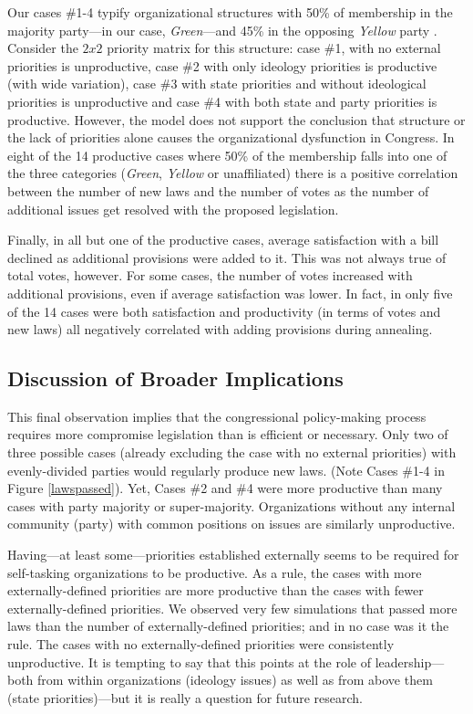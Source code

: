 \documentclass[pdftex,12pt]{llncs}
\begin{document}
Our cases \#1-4 typify organizational structures with 50\% of membership in the majority party---in our case, \textit{Green}---and 45\% in the opposing \textit{Yellow} party .
Consider the $2 x 2$ priority matrix for this structure: case \#1, with no external priorities is unproductive, case \#2 with only ideology priorities is productive (with wide variation), case \#3 with state priorities and without ideological priorities is unproductive and case \#4 with both state and party priorities is productive. 
However, the model does not support the conclusion that structure or the lack of priorities alone causes the organizational dysfunction in Congress.
In eight of the 14 productive cases where 50\% of the membership falls into one of the three categories (\textit{Green}, \textit{Yellow} or unaffiliated) there is a positive correlation between the number of new laws and the number of votes as the number of additional issues get resolved with the proposed legislation.   

Finally, in all but one of the productive cases, average satisfaction with a bill declined as additional provisions were added to it. 
This was not always true of total votes, however.
For some cases, the number of votes increased with additional provisions, even if average satisfaction was lower. 
In fact, in only five of the 14 cases were both satisfaction and productivity (in terms of votes and new laws) all negatively correlated with adding provisions during annealing. 
 
\subsection{Discussion of Broader Implications}
This final observation implies that the congressional policy-making process requires more compromise legislation than is efficient or necessary. 
Only two of three possible cases (already excluding the case with no external priorities) with evenly-divided parties would regularly produce new laws. 
(Note Cases \#1-4 in Figure \ref{lawspassed}). 
Yet, Cases \#2 and \#4 were more productive than many cases with party majority or super-majority.  
Organizations without any internal community (party) with common positions on issues are similarly unproductive.

Having---at least some---priorities established externally seems to be required for self-tasking organizations to be productive. 
As a rule, the cases with more externally-defined priorities are more productive than the cases with fewer externally-defined priorities. 
We observed very few simulations that passed more laws than the number of externally-defined priorities; and in no case was it the rule. 
The cases with no externally-defined priorities were consistently unproductive. 
It is tempting to say that this points at the role of leadership---both from within organizations (ideology issues) as well as from above them (state priorities)---but it is really a question for future research.  
\end{document}
